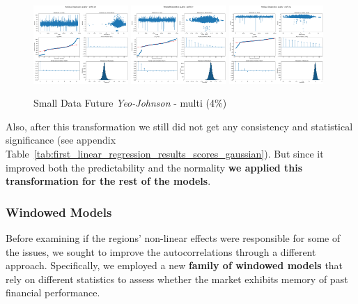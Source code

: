 \documentclass[11pt,english,a4paper,hidelinks]{book}
\begin{document}
\begin{figure}[H]
    \centering
    \includegraphics[width=0.32\textwidth]{images/code/models/linear_regression/first_model/Multi/quality_profit_1m_residuals - Gaussian.png}
    \includegraphics[width=0.32\textwidth]{images/code/models/linear_regression/first_model/Multi/quality_profit_1y_residuals - Gaussian.png}
    \includegraphics[width=0.32\textwidth]{images/code/models/linear_regression/first_model/Multi/quality_profit_5y_residuals - Gaussian.png}
    \caption{Small Data Future \textit{Yeo-Johnson} - \acrshort{multi} (4\%)}
    \label{fig:first_linear_regression_gaussian_residuals}
\end{figure}

\noindent Also, after this transformation we still did not get any consistency and statistical significance (see appendix Table~\ref{tab:first_linear_regression_results_scores_gaussian}). But since it improved both the predictability and the normality \textbf{we applied this transformation for the rest of the models}.

\subsubsection{Windowed Models}

\noindent Before examining if the regions' non-linear effects were responsible for some of the issues, we sought to improve the autocorrelations through a different approach. Specifically, we employed a new \textbf{family of windowed models} that rely on different statistics to assess whether the market exhibits memory of past financial performance.
\end{document}
